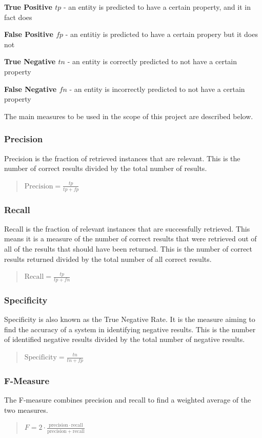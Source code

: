 \textbf{True Positive $tp$} - an entity is predicted to have a certain property, and it in fact does

\textbf{False Positive $fp$} - an entitiy is predicted to have a certain propery but it does not

\textbf{True Negative $tn$} - an entity is correctly predicted to not have a certain property

\textbf{False Negative $fn$} - an entity is incorrectly predicted to not have a certain property

The main measures to be used in the scope of this project are described below.

\subsubsection{Precision}
Precision is the fraction of retrieved instances that are relevant. This is the number of correct results divided by the total number of results.
\begin{quote}
$\mathrm{Precision}=\frac{tp}{tp+fp}$
\end{quote}

\subsubsection{Recall}
Recall is the fraction of relevant instances that are successfully retrieved. This means it is a measure of the number of correct results that were retrieved out of all of the results that should have been returned. This is the number of correct results returned divided by the total number of all correct results.
\begin{quote}
$\mathrm{Recall}=\frac{tp}{tp+fn}$
\end{quote}

\subsubsection{Specificity}
Specificity is also known as the True Negative Rate. It is the measure aiming to find the accuracy of a system in identifying negative results. This is the number of identified negative results divided by the total number of negative results.
\begin{quote}
$\mathrm{Specificity}=\frac{tn}{tn+fp}$
\end{quote}

\subsubsection{F-Measure}
The F-measure combines precision and recall to find a weighted average of the two measures.
\begin{quote}
$F = 2 \cdot \frac{\mathrm{precision} \cdot \mathrm{recall}}{\mathrm{precision} + \mathrm{recall}}$
\end{quote}

